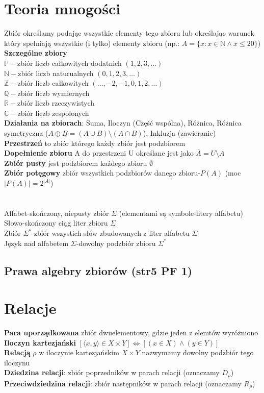 \documentclass[a4paper,12pt]{article}
\begin{document}
\section{Teoria mnogości}
Zbiór określamy podając wszystkie elementy tego zbioru lub określając warunek który spełniają wszystkie (i tylko) elementy zbioru (np.: $A=\{x: x \in \mathbb{N} \land x \leq 20 \}$)\\
\textbf{Szczególne zbiory}\\
$\mathbb{P}-$zbiór liczb całkowitych dodatnich $(1, 2, 3,\dots)$ \\
$\mathbb{N}-$zbiór liczb naturualnych $(0, 1, 2, 3,\dots)$ \\
$\mathbb{Z}-$zbiór liczb całkowitych $(\dots, -2, -1, 0, 1, 2,\dots)$ \\
$\mathbb{Q}-$zbiór liczb wymiernych \\
$\mathbb{R}-$zbiór liczb rzeczywistych \\
$\mathbb{C}-$zbiór liczb zespolonych \\
\textbf{Działania na zbiorach}: Suma, Iloczyn (Część wspólna), Różnica, Różnica symetryczna ($A \oplus B=(A\cup B)\setminus (A \cap B)$), Inkluzja (zawieranie) \\
\textbf{Przestrzeń} to zbiór którego każdy zbiór jest podzbiorem \\
\textbf{Dopełnienie zbioru} A do przestrzeni U określane jest jako $\bar A=U \setminus A$ \\
\textbf{Zbiór pusty} jest podzbiorem każdego zbioru $\emptyset$ \\
\textbf{Zbiór potęgowy} zbiór wszystkich podzbiorów danego zbioru-$P(A)$ (moc $|P(A)|=2^{|A|}$)\\
\\
\\
Alfabet-skończony, niepusty zbiór $\Sigma$ (elementami są symbole-litery alfabetu) \\
Słowo-skończony ciąg liter zbioru $\Sigma$ \\
Zbiór $\Sigma ^*$-zbiór wszystich słów zbudowanych z liter alfabetu $\Sigma$ \\
Język nad alfabetem $\Sigma$-dowolny podzbiór zbioru $\Sigma ^*$ 
\subsection{Prawa algebry zbiorów (str5 PF 1)}

\section{Relacje}
\textbf{Para uporządkowana} zbiór  dwuelementowy, gdzie jeden z elemtów wyróżniono \\
\textbf{Iloczyn kartezjański} $[\langle x,y \rangle \in X \times Y] \iff [(x\in X)\wedge (y\in Y)]$ \\
\textbf{Relacją} $\rho$ w iloczynie kartezjańskim $X \times Y$ nazwymamy dowolny podzbiór tego iloczynu \\
\textbf{Dziedzina relacji}: zbiór poprzedników w parach relacji (oznaczamy $D_\rho$) \\
\textbf{Przeciwdziedzina relacji}: zbiór następników w parach relacji (oznaczamy $R_\rho$)
\end{document}
